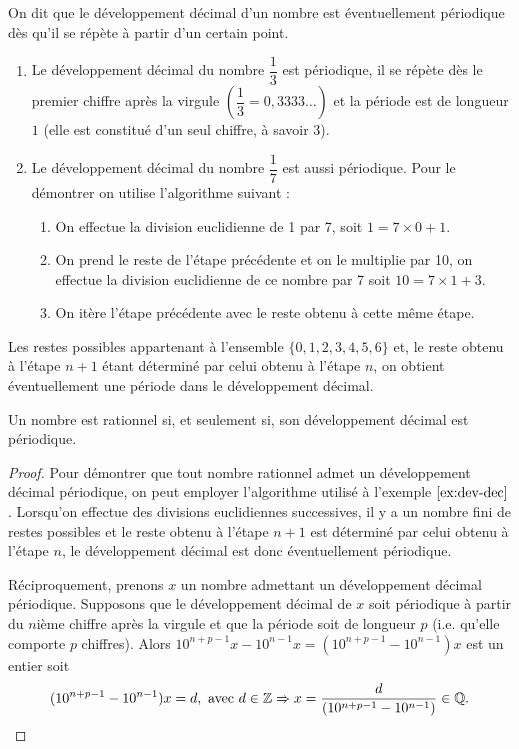 \documentclass[a4paper, 12pt]{report}
\begin{document}
\begin{defn}
On dit que le développement décimal d’un nombre est éventuellement périodique dès qu’il se répète à partir d’un certain point.
\end{defn}

\begin{ex}
\label{ex:dev-dec}
\begin{enumerate}
\item Le développement décimal du nombre $\dfrac13$ est périodique, il se répète dès le premier chiffre après la virgule $\left ( \dfrac13 = 0,3333 \dots \right )$ et la période est de longueur $1$ (elle est constitué d'un seul chiffre, à savoir $3$).
\item Le développement décimal du nombre $\dfrac17$ est aussi périodique. Pour le démontrer on utilise l'algorithme suivant :
\begin{enumerate}
\item On effectue la division euclidienne de 1 par 7, soit $1 = 7 \times 0 + 1$.
\item On prend le reste de l'étape précédente et on le multiplie par 10, on effectue la division euclidienne de ce nombre par 7 soit
$10 = 7 \times 1 + 3$.
\item On itère l'étape précédente avec le reste obtenu à cette même étape.
\end{enumerate}
\end{enumerate}
Les restes possibles appartenant à l'ensemble $\{0, 1, 2, 3, 4, 5, 6 \}$ et, le reste obtenu à l'étape $n+1$ étant déterminé par celui obtenu à l'étape $n$, on obtient éventuellement une période dans le développement décimal.
\end{ex}

\begin{thm}
Un nombre est rationnel si, et seulement si, son développement décimal est périodique.
\end{thm}

\begin{proof}
Pour démontrer que tout nombre rationnel admet un développement décimal périodique, on peut employer l'algorithme utilisé à l'exemple $\ref{ex:dev-dec}$. Lorsqu'on effectue des divisions euclidiennes successives, il y a un nombre fini de restes possibles et le reste obtenu à l'étape $n+1$ est déterminé par celui obtenu à l'étape $n$, le développement décimal est donc éventuellement périodique.

Réciproquement, prenons $x$ un nombre admettant un développement décimal périodique. Supposons que le développement décimal de $x$ soit périodique à partir du $n$ième chiffre après la virgule et que la période soit de longueur $p$ (i.e. qu'elle comporte $p$ chiffres). Alors $10^{n+p-1} x - 10^{n-1} x = (10^{n+p-1}  - 10^{n-1}) x$ est un entier soit 
\[ (10^{n+p-1}  - 10^{n-1}) x = d, \text{ avec } d \in \mathbb{Z} \Rightarrow x = \frac{d}{(10^{n+p-1}  - 10^{n-1})} \in \mathbb{Q}. \]
\end{proof}
\end{document}
